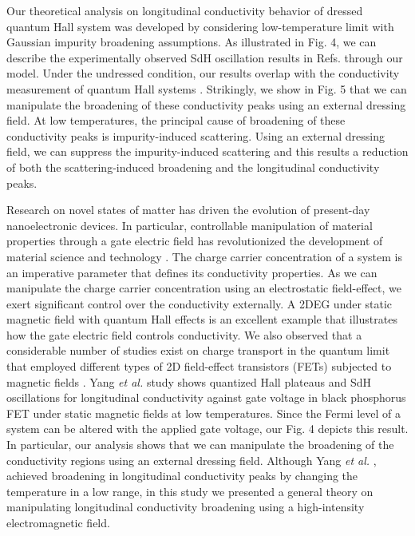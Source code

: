 \documentclass{article}
\begin{document}
\begin{itemize}
{  Our theoretical analysis on longitudinal conductivity behavior of dressed quantum Hall system was developed by considering low-temperature limit with Gaussian impurity broadening assumptions.
  As illustrated in Fig. 4, we can describe the experimentally observed SdH oscillation results in Refs.\cite{endo09,wakabayashi78} through our model.
  Under the undressed condition, our results overlap with the conductivity measurement of quantum Hall systems \cite{endo09}. Strikingly, we show in Fig. 5 that we can manipulate the broadening of these conductivity peaks using an external dressing field. At low temperatures, the principal cause of broadening of these conductivity peaks is impurity-induced scattering. Using an external dressing field, we can suppress the impurity-induced scattering and this results a reduction of both the scattering-induced broadening and the longitudinal conductivity peaks.

  Research on novel states of matter has driven the evolution of present-day nanoelectronic devices. In particular, controllable manipulation of material properties through a gate electric field has revolutionized the development of material science and technology \cite{ahn03,deng18}.
  The charge carrier concentration of a system is an imperative parameter that defines its conductivity properties.
  As we can manipulate the charge carrier concentration using an electrostatic field-effect, we exert significant control over the conductivity externally.
  A 2DEG under static magnetic field with quantum Hall effects is an excellent example that illustrates how the gate electric field controls conductivity.
  We also observed that a considerable number of studies exist on charge transport in the quantum limit that employed different types of 2D field-effect transistors (FETs) subjected to magnetic fields \cite{wakabayashi78,yang18,long20,li14}. Yang \textit{et al.} \cite{yang18} study shows quantized Hall plateaus and SdH oscillations for longitudinal conductivity against gate voltage in black phosphorus FET under static magnetic fields at low temperatures. Since the Fermi level of a system can be altered with the applied gate voltage, our Fig. 4 depicts this result.
  In particular, our analysis shows that we can manipulate the broadening of the conductivity regions using an external dressing field. Although Yang \textit{et al.} \cite{yang18}, achieved broadening in longitudinal conductivity peaks by changing the temperature in a low range, in this study we presented a general theory on manipulating longitudinal conductivity broadening using a high-intensity electromagnetic field.

}
\end{itemize}
\end{document}
